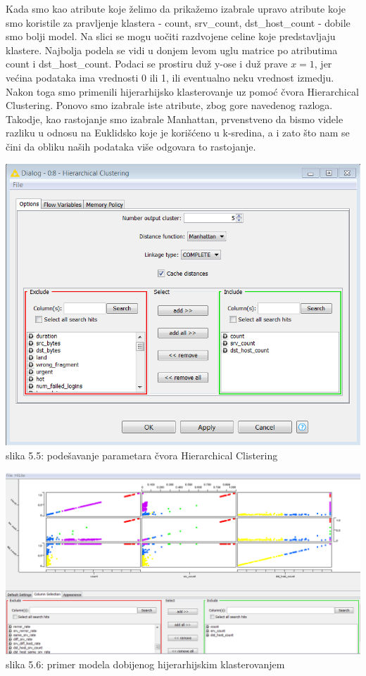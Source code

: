\documentclass[10pt]{article}
\begin{document}
Kada smo kao atribute koje \v zelimo da prika\v zemo izabrale upravo atribute koje smo koristile za pravljenje klastera - count, srv\_count, dst\_host\_count - dobile smo bolji model. Na slici se mogu uo\v citi razdvojene celine koje predstavljaju klastere. Najbolja podela se vidi u donjem levom uglu matrice po atributima count i dst\_host\_count. Podaci se prostiru du\v z y-ose i du\v z prave $x = 1$, jer ve\' cina podataka ima vrednosti 0 ili 1, ili eventualno neku vrednost izmedju.\\
Nakon toga smo primenili hijerarhijsko klasterovanje uz pomo\' c \v cvora Hierarchical Clustering. Ponovo smo izabrale iste atribute, zbog gore navedenog razloga. Takodje, kao rastojanje smo izabrale Manhattan, prvenstveno da bismo videle razliku u odnosu na Euklidsko koje je kori\v s\' ceno u k-sredina, a i zato \v sto nam se \v cini da obliku na\v sih podataka vi\v se odgovara to rastojanje.

\begin{center}
\includegraphics[width = \textwidth, height = 8 cm ]{Klaster5}
slika 5.5: pode\v savanje parametara \v cvora Hierarchical Clistering\\
\end{center}

\begin{center}
\includegraphics[width = \textwidth,height = 6 cm]{Klaster6}
slika 5.6: primer modela dobijenog hijerarhijskim klasterovanjem\\
\end{center}
\end{document}
